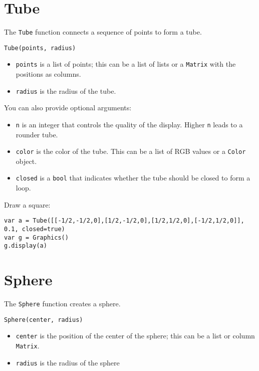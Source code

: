 \hypertarget{tube}{%
\section{Tube}\label{tube}}

The \texttt{Tube} function connects a sequence of points to form a tube.

\begin{lstlisting}
Tube(points, radius)
\end{lstlisting}

\begin{itemize}

\item
  \texttt{points} is a list of points; this can be a list of lists or a
  \texttt{Matrix} with the positions as columns.
\item
  \texttt{radius} is the radius of the tube.
\end{itemize}

You can also provide optional arguments:

\begin{itemize}

\item
  \texttt{n} is an integer that controls the quality of the display.
  Higher \texttt{n} leads to a rounder tube.
\item
  \texttt{color} is the color of the tube. This can be a list of RGB
  values or a \texttt{Color} object.
\item
  \texttt{closed} is a \texttt{bool} that indicates whether the tube
  should be closed to form a loop.
\end{itemize}

Draw a square:

\begin{lstlisting}
var a = Tube([[-1/2,-1/2,0],[1/2,-1/2,0],[1/2,1/2,0],[-1/2,1/2,0]], 0.1, closed=true)
var g = Graphics()
g.display(a)
\end{lstlisting}

\hypertarget{sphere}{%
\section{Sphere}\label{sphere}}

The \texttt{Sphere} function creates a sphere.

\begin{lstlisting}
Sphere(center, radius)
\end{lstlisting}

\begin{itemize}

\item
  \texttt{center} is the position of the center of the sphere; this can
  be a list or column \texttt{Matrix}.
\item
  \texttt{radius} is the radius of the sphere
\end{itemize}

